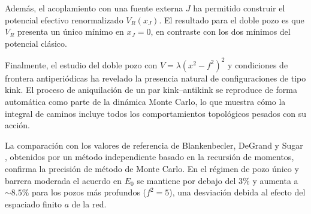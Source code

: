 \documentclass[11pt,a4paper,twoside,pdf]{article}
\numberwithin{equation}{section}
\begin{document}
Además, el acoplamiento con una fuente externa $J$ ha permitido construir el potencial efectivo renormalizado $V_R(x_J)$. El resultado para el doble pozo es que $V_R$ presenta un único mínimo en $x_J = 0$, en contraste con los dos mínimos del potencial clásico.

Finalmente, el estudio del doble pozo con $V = \lambda(x^2-f^2)^2$ y condiciones de frontera antiperiódicas ha revelado la presencia natural de configuraciones de tipo kink. El proceso de aniquilación de un par kink--antikink se reproduce de forma automática como parte de la dinámica Monte Carlo, lo que muestra cómo la integral de caminos incluye  todos los comportamientos topológicos pesados con su acción.



La comparación con los valores de referencia de Blankenbecler, DeGrand y Sugar \cite{degrand1980numerical}, obtenidos por un método independiente basado en la recursión de momentos, confirma la precisión de método de Monte Carlo. En el régimen de pozo único y barrera moderada el acuerdo en $E_0$ se mantiene por debajo del $3\%$ y aumenta a $\sim 8.5\%$ para los pozos más profundos ($f^2 = 5$), una desviación debida al efecto del espaciado finito $a$ de la red.




\newpage




\end{document}
